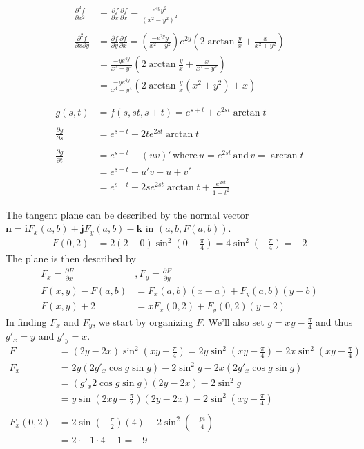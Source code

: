 \documentclass[a4paper,norsk,12pt]{article}
\begin{document}
\begin{align*}
  \frac{\partial^2 f}{\partial x^2} &= \frac{\partial f}{\partial x} \frac{\partial f}{\partial x} 
    = \frac{e^{4y}y^2}{(x^2-y^2)^2} \\
  \\
  \frac{\partial^2 f}{\partial x \partial y} &=
    \frac{\partial f}{\partial y} \frac{\partial f}{\partial x} =
    \left(\frac{-e^{2y}y}{x^2-y^2}\right) e^{2y}\left( 2\arctan{\frac{y}{x}} + \frac{x}{x^2+y^2} \right) \\
  &= \frac{-ye^{4y}}{x^2-y^2}
          \left(
            2\arctan{\frac{y}{x}} + \frac{x}{x^2+y^2}
          \right) \\
  &= \frac{-ye^{4y}}{x^4-y^4}
          \left(
            2\arctan{\frac{y}{x}}(x^2+y^2) + x
          \right)
\end{align*}

\begin{align*}
  g(s,t) &= f(s, st, s+t) = e^{s+t} + e^{2st}\arctan{t} \\
  \\
  \frac{\partial g}{\partial s} &= e^{s+t} + 2te^{2st}\arctan{t} \\
  \\
  \frac{\partial g}{\partial t} &= e^{s+t} + (uv)' \,\text{where}\, u=e^{2st}
    \,\text{and}\, v=\arctan{t} \\
    &= e^{s+t} + u'v + u+v' \\
    &= e^{s+t} + 2se^{2st}\arctan{t} + \frac{e^{2st}}{1+t^2}
\end{align*}

The tangent plane can be described by the normal vector $\mathbf{n} =
\mathbf{i}F_x(a,b) + \mathbf{j}F_y(a,b) - \mathbf{k}$ in $(a, b, F(a,b))$.
%
\begin{align*}
  F(0,2) &= 2(2-0)\sin^2{(0-\frac{\pi}{4})}
    = 4\sin^2{(-\frac{\pi}{4})} = -2
\end{align*}
The plane is then described by
\begin{align*}
  F_x = \frac{\partial F}{\partial x}&,
  F_y = \frac{\partial F}{\partial y} \\
  F(x,y) - F(a,b) &= F_x(a,b)(x-a) + F_y(a,b)(y-b) \\
  F(x,y) + 2 &= xF_x(0,2) + F_y(0,2)(y-2)
\end{align*}
%
In finding $F_x$ and $F_y$, we start by organizing $F$. We'll also set
$g=xy-\frac{\pi}{4}$ and thus $g'_x=y$ and $g'_y=x$.
\begin{align*}
  F &= (2y-2x)\sin^2{(xy-\frac{\pi}{4})}
      = 2y\sin^2{(xy-\frac{\pi}{4})} - 2x\sin^2{(xy-\frac{\pi}{4})}
      \\
  F_x &= 2y(2g'_x\cos{g}\sin{g})
      - 2\sin^2{g} - 2x(2g'_x\cos{g}\sin{g}) \\
      &= (g'_x2\cos{g}\sin{g})(2y-2x) - 2\sin^2{g} \\
      &= y\sin{(2xy-\frac{\pi}{2})}(2y-2x) - 2\sin^2{(xy-\frac{\pi}{4})} \\
      \\
  F_x(0,2) &= 2\sin{(-\frac{\pi}{2})}(4) -2\sin^2{(-\frac{pi}{4})} \\
    &= 2\cdot-1\cdot4 -1 = -9
\end{align*}
\end{document}
